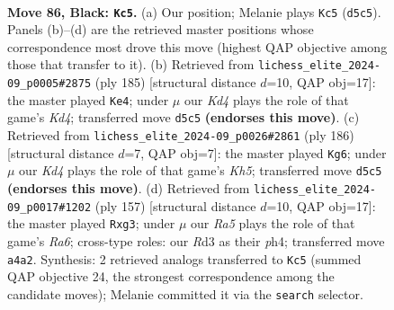 \documentclass[11pt]{article}
\begin{document}
\begin{figure}[p]\centering
\begin{subfigure}{0.46\textwidth}\centering
\resizebox{\linewidth}{!}{%
\newchessgame
\chessboard[
  setfen={1R6/8/8/3k2K1/r6P/3r4/8/8 b - - 14 86},
  showmover=false,
  pgfstyle=straightmove, color=movearrow, markmove={d5-c5}
]}
\caption{}
\end{subfigure}\hfill
\begin{subfigure}{0.46\textwidth}\centering
\resizebox{\linewidth}{!}{%
\newchessgame
\chessboard[
  setfen={6K1/5P2/6R1/3k4/8/8/5r2/8 b - - 4 93},
  showmover=false,
  pgfstyle=straightmove, color=movearrow, markmove={d5-e4}
]}
\caption{}
\end{subfigure}
\\[4pt]
\begin{subfigure}{0.46\textwidth}\centering
\resizebox{\linewidth}{!}{%
\newchessgame
\chessboard[
  setfen={8/8/8/5R1K/8/5pk1/8/6r1 w - - 9 94},
  showmover=false,
  pgfstyle=straightmove, color=movearrow, markmove={h5-g6}
]}
\caption{}
\end{subfigure}\hfill
\begin{subfigure}{0.46\textwidth}\centering
\resizebox{\linewidth}{!}{%
\newchessgame
\chessboard[
  setfen={3k4/8/8/8/4K2P/r5P1/8/4R3 b - - 2 79},
  showmover=false,
  pgfstyle=straightmove, color=movearrow, markmove={a3-g3}
]}
\caption{}
\end{subfigure}
\caption{\textbf{Move 86, Black: \texttt{Kc5}.} (a) Our position; Melanie plays \texttt{Kc5} (\texttt{d5c5}). Panels (b)--(d) are the retrieved master positions whose correspondence most drove this move (highest QAP objective among those that transfer to it). (b) Retrieved from \texttt{lichess\_elite\_2024-09\_p0005\#2875} (ply 185) [structural distance $d$=10, QAP obj=17]: the master played \texttt{Ke4}; under $\mu$ our \emph{Kd4} plays the role of that game's \emph{Kd4}; transferred move \texttt{d5c5} \textbf{(endorses this move)}. (c) Retrieved from \texttt{lichess\_elite\_2024-09\_p0026\#2861} (ply 186) [structural distance $d$=7, QAP obj=7]: the master played \texttt{Kg6}; under $\mu$ our \emph{Kd4} plays the role of that game's \emph{Kh5}; transferred move \texttt{d5c5} \textbf{(endorses this move)}. (d) Retrieved from \texttt{lichess\_elite\_2024-09\_p0017\#1202} (ply 157) [structural distance $d$=10, QAP obj=17]: the master played \texttt{Rxg3}; under $\mu$ our \emph{Ra5} plays the role of that game's \emph{Ra6}; cross-type roles: our \emph{R}d3 as their \emph{p}h4; transferred move \texttt{a4a2}. Synthesis: 2 retrieved analogs transferred to \texttt{Kc5} (summed QAP objective 24, the strongest correspondence among the candidate moves); Melanie committed it via the \texttt{search} selector.}
\label{fig:thought-m171}
\end{figure}
\end{document}
